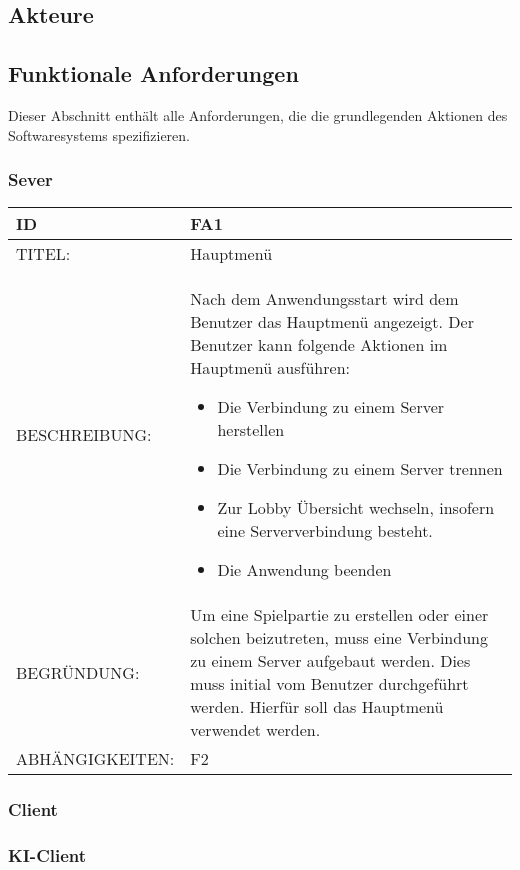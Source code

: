 \documentclass{uulm-assignment}
\begin{document}
\subsection{Akteure}



\subsection{Funktionale Anforderungen}

Dieser Abschnitt enthält alle Anforderungen, die die grundlegenden Aktionen des Softwaresystems
spezifizieren.

\subsubsection{Sever}



\begin{tabularx}{16cm}{l|X}
\textbf{ID} & \textbf{FA1} \\
\hline
TITEL: & Hauptmenü \\
\hline
BESCHREIBUNG: & Nach dem Anwendungsstart wird dem Benutzer das Hauptmenü angezeigt. Der Benutzer kann folgende Aktionen im Hauptmenü ausführen: 
\begin{itemize}
\item Die Verbindung zu einem Server herstellen
\item Die Verbindung zu einem Server trennen
\item Zur Lobby Übersicht wechseln, insofern eine Serververbindung besteht.
\item Die Anwendung beenden
\end{itemize}
\\
\hline
BEGRÜNDUNG: & Um eine Spielpartie zu erstellen oder einer solchen beizutreten, muss eine Verbindung zu einem Server aufgebaut werden. Dies muss initial vom Benutzer durchgeführt werden. Hierfür soll das Hauptmenü verwendet werden.\\
\hline
ABHÄNGIGKEITEN: & F2\\
\end{tabularx}

\subsubsection{Client}

\subsubsection{KI-Client}

\end{document}
